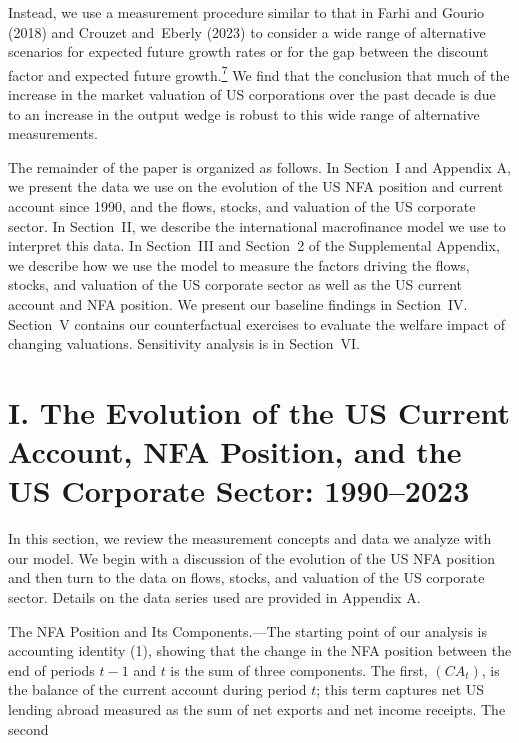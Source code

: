 \documentclass[11pt]{article}
\begin{document}
Instead, we use a measurement procedure similar to that in Farhi and Gourio (2018) and Crouzet and Eberly (2023) to consider a wide range of alternative scenarios for expected future growth rates or for the gap between the discount factor and expected future growth.\hyperlink{fn:7}{\textsuperscript{7}} We find that the conclusion that much of the increase in the market valuation of US corporations over the past decade is due to an increase in the output wedge is robust to this wide range of alternative measurements.


The remainder of the paper is organized as follows. In Section I and Appendix A, we present the data we use on the evolution of the US NFA position and current account since 1990, and the flows, stocks, and valuation of the US corporate sector. In Section II, we describe the international macrofinance model we use to interpret this data. In Section III and Section 2 of the Supplemental Appendix, we describe how we use the model to measure the factors driving the flows, stocks, and valuation of the US corporate sector as well as the US current account and NFA position. We present our baseline findings in Section IV. Section V contains our counterfactual exercises to evaluate the welfare impact of changing valuations. Sensitivity analysis is in Section VI.


\section*{I. The Evolution of the US Current Account, NFA Position, and the US Corporate Sector: 1990–2023}


In this section, we review the measurement concepts and data we analyze with our model. We begin with a discussion of the evolution of the US NFA position and then turn to the data on flows, stocks, and valuation of the US corporate sector. Details on the data series used are provided in Appendix A.


The NFA Position and Its Components.—The starting point of our analysis is accounting identity (1), showing that the change in the NFA position between the end of periods $t-1$ and $t$ is the sum of three components. The first, $(CA_{t})$, is the balance of the current account during period $t$; this term captures net US lending abroad measured as the sum of net exports and net income receipts. The second
\end{document}
